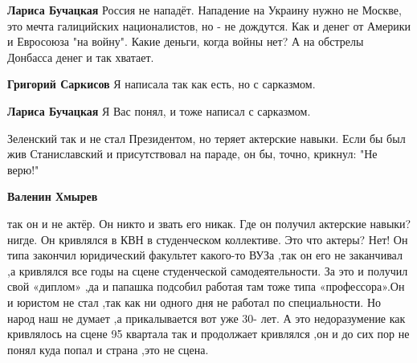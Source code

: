 \begin{itemize}
\begin{itemize}
\textbf{Лариса Бучацкая} Россия не нападёт. Нападение на Украину нужно не Москве, это мечта галицийских националистов, но - не дождутся. Как и денег от Америки и Евросоюза "на войну". Какие деньги, когда войны нет? А на обстрелы Донбасса денег и так хватает.

 
\textbf{Григорий Саркисов}
Я написала так как есть, но с сарказмом.

 
\textbf{Лариса Бучацкая} Я Вас понял, и тоже написал с сарказмом.
\end{itemize}

 

Зеленский так и не стал Президентом, но теряет актерские навыки. Если бы был жив
Станиславский и присутствовал на параде, он бы, точно, крикнул: "Не верю!"

\begin{itemize}
 
\textbf{Валенин Хмырев} 

так он и не актёр. Он никто и звать его никак. Где он
получил актерские навыки? нигде. Он кривлялся в КВН в студенческом коллективе. Это
что актеры? Нет! Он типа закончил юридический факультет какого-то ВУЗа ,так он
его не заканчивал ,а кривлялся все годы на сцене студенческой
самодеятельности. За это и получил свой «диплом» ,да и папашка подсобил работая
там тоже типа «профессора».Он и юристом не стал ,так как ни одного дня не
работал по специальности. Но народ наш не думает ,а прикалывается вот уже 30-
лет. А это недоразумение как кривлялось на сцене 95 квартала так и продолжает
кривлялся ,он и до сих пор не понял куда попал и страна ,это не сцена.


\end{itemize}
\end{itemize}
